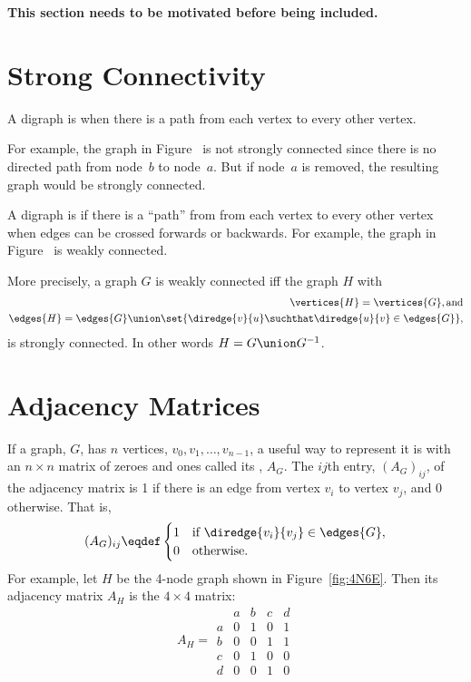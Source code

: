 \begin{editingnotes}

\textbf{This section needs to be motivated before being included.}

\section{Strong Connectivity}

\begin{definition}
A digraph is  when there is a path from each
vertex to every other vertex.
\end{definition}

For example, the graph in Figure~%
is not strongly connected since there is no directed path from
node~$b$ to node~$a$.  But if node~$a$ is removed, the resulting graph
would be strongly connected.

A digraph is  \iffalse or, more simply,
\emph{connected})\fi if there is a ``path'' from from each vertex to
every other vertex when edges can be crossed forwards or backwards.
For example, the graph in Figure~%
is weakly connected.

More precisely, a graph $G$ is weakly connected iff the graph $H$ with
\begin{align*}
\vertices{H} = \vertices{G}, \text{and}\\
\edges{H} = \edges{G} \union \set{\diredge{v}{u} \suchthat \diredge{u}{v} \in \edges{G}},
\end{align*}
is strongly connected.  In other words $H = G \union G^{-1}$.
\end{editingnotes}

\section{Adjacency Matrices}
If a graph, $G$, has $n$ vertices, $v_0,v_1,\dots, v_{n-1}$, a useful
way to represent it is with an $n \times n$ matrix of zeroes and ones
called its , $A_G$.  The $ij$th
entry, $(A_G)_{ij}$, of the adjacency matrix is 1 if there is an edge
from vertex $v_i$ to vertex $v_j$, and 0 otherwise.  That is,
\[
(A_G)_{ij} \eqdef \begin{cases} 1 & \text{if } \diredge{v_i}{v_j} \in
  \edges{G},\\
0 & \text{otherwise}.
\end{cases}
\]
For example, let $H$ be the 4-node graph shown in
Figure~\ref{fig:4N6E}.  Then its adjacency matrix $A_H$ is the $4 \times
4$ matrix:
\[
A_H =\begin{array}{c|cccc|}
  &  a & b & c & d \\ \hline
a &  0 & 1 & 0 & 1 \\
b &  0 & 0 & 1 & 1 \\
c &  0 & 1 & 0 & 0 \\
d &  0 & 0 & 1 & 0
\end{array}
\]

